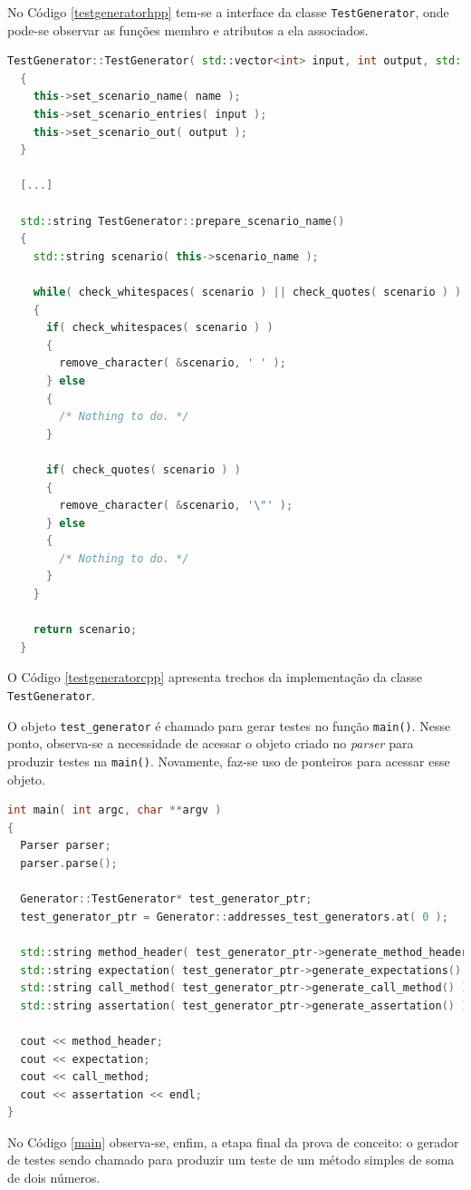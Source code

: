 \par
\indent No Código \ref{testgeneratorhpp} tem-se a interface da classe \lstinline|TestGenerator|, onde pode-se observar as funções membro e atributos a ela associados.
\par
\begin{lstlisting}[language=C++, label=testgeneratorcpp, caption=Trecho de implementação da classe TestGenerator]
  TestGenerator::TestGenerator( std::vector<int> input, int output, std::string name )
  {
    this->set_scenario_name( name );
    this->set_scenario_entries( input );
    this->set_scenario_out( output );
  }
  
  [...]
  
  std::string TestGenerator::prepare_scenario_name()
  {
    std::string scenario( this->scenario_name );

    while( check_whitespaces( scenario ) || check_quotes( scenario ) )
    {
      if( check_whitespaces( scenario ) )
      {
        remove_character( &scenario, ' ' );
      } else
      {
        /* Nothing to do. */
      }

      if( check_quotes( scenario ) )
      {
        remove_character( &scenario, '\"' );
      } else
      {
        /* Nothing to do. */
      }
    }

    return scenario;
  }
\end{lstlisting}
\par
\indent O Código \ref{testgeneratorcpp} apresenta trechos da implementação da classe \lstinline|TestGenerator|.
\par
\indent O objeto \lstinline|test_generator| é chamado para gerar testes no função \lstinline|main()|. Nesse ponto, observa-se a necessidade de acessar o objeto criado no \textit{parser} para produzir testes na \lstinline|main()|. Novamente, faz-se uso de ponteiros para acessar esse objeto.
\begin{lstlisting}[language=C++, label=main, caption=função \lstinline|main()| Fazendo Uso da \lstinline|TestGenerator|]
int main( int argc, char **argv )
{
  Parser parser;
  parser.parse();

  Generator::TestGenerator* test_generator_ptr;
  test_generator_ptr = Generator::addresses_test_generators.at( 0 );

  std::string method_header( test_generator_ptr->generate_method_header() );
  std::string expectation( test_generator_ptr->generate_expectations() );
  std::string call_method( test_generator_ptr->generate_call_method() );
  std::string assertation( test_generator_ptr->generate_assertation() );

  cout << method_header;
  cout << expectation;
  cout << call_method;
  cout << assertation << endl;
}
\end{lstlisting}
\par
\indent No Código \ref{main} observa-se, enfim, a etapa final da prova de conceito: o gerador de testes sendo chamado para produzir um teste de um método simples de soma de dois números.


